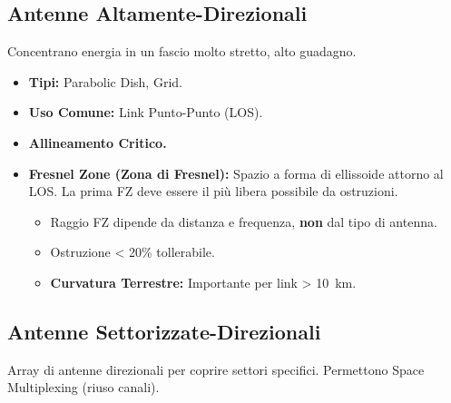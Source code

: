 \subsection{Antenne Altamente-Direzionali}
Concentrano energia in un fascio molto stretto, alto guadagno.
\begin{itemize}
    \item \textbf{Tipi:} Parabolic Dish, Grid.
    \item \textbf{Uso Comune:} Link Punto-Punto (LOS).
    \item \textbf{Allineamento Critico.}
    \item \textbf{Fresnel Zone (Zona di Fresnel):} Spazio a forma di ellissoide attorno al LOS. La prima FZ deve essere il più libera possibile da ostruzioni.
    \begin{itemize}
        \item Raggio FZ dipende da distanza e frequenza, \textbf{non} dal tipo di antenna.
        \item Ostruzione < 20\% tollerabile.
        \item \textbf{Curvatura Terrestre:} Importante per link > \SI{10}{\kilo\meter}.
    \end{itemize}
\end{itemize}
\begin{center}
\end{center}

\subsection{Antenne Settorizzate-Direzionali}
Array di antenne direzionali per coprire settori specifici. Permettono Space Multiplexing (riuso canali).

